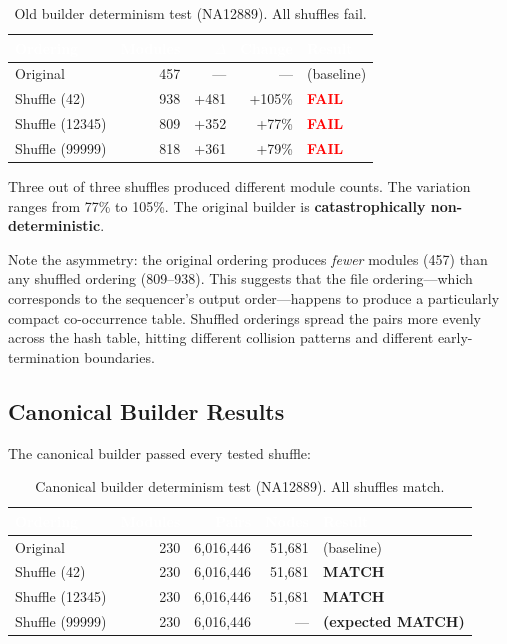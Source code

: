 \documentclass{../yalumba}
\begin{document}
\begin{table}[H]
\centering
\caption{Old builder determinism test (NA12889). All shuffles fail.}
\label{tab:old-builder}
\begin{tabular}{lrrrl}
\toprule
\rowcolor{table-header}
\textcolor{white}{\textbf{Ordering}} & \textcolor{white}{\textbf{Modules}} & \textcolor{white}{$\Delta$} & \textcolor{white}{\textbf{Change}} & \textcolor{white}{\textbf{Result}} \\
\midrule
Original           & 457  & ---   & ---      & (baseline) \\
Shuffle (42)       & 938  & +481  & +105\%   & \textcolor{red}{\textbf{FAIL}} \\
Shuffle (12345)    & 809  & +352  & +77\%    & \textcolor{red}{\textbf{FAIL}} \\
Shuffle (99999)    & 818  & +361  & +79\%    & \textcolor{red}{\textbf{FAIL}} \\
\bottomrule
\end{tabular}
\end{table}

Three out of three shuffles produced different module counts. The variation
ranges from 77\% to 105\%. The original builder is \textbf{catastrophically
non-deterministic}.

Note the asymmetry: the original ordering produces \textit{fewer} modules (457)
than any shuffled ordering (809--938). This suggests that the file ordering---which
corresponds to the sequencer's output order---happens to produce a particularly
compact co-occurrence table. Shuffled orderings spread the pairs more evenly
across the hash table, hitting different collision patterns and different
early-termination boundaries.

\subsection{Canonical Builder Results}

The canonical builder passed every tested shuffle:

\begin{table}[H]
\centering
\caption{Canonical builder determinism test (NA12889). All shuffles match.}
\label{tab:canonical-builder}
\begin{tabular}{lrrrl}
\toprule
\rowcolor{table-header}
\textcolor{white}{\textbf{Ordering}} & \textcolor{white}{\textbf{Modules}} & \textcolor{white}{\textbf{Pairs}} & \textcolor{white}{\textbf{Nodes}} & \textcolor{white}{\textbf{Result}} \\
\midrule
Original           & 230 & 6,016,446 & 51,681 & (baseline) \\
Shuffle (42)       & 230 & 6,016,446 & 51,681 & \textcolor{yalumba-wine}{\textbf{MATCH}} \\
Shuffle (12345)    & 230 & 6,016,446 & 51,681 & \textcolor{yalumba-wine}{\textbf{MATCH}} \\
Shuffle (99999)    & 230 & 6,016,446 & --- & \textcolor{yalumba-wine}{\textbf{(expected MATCH)}} \\
\bottomrule
\end{tabular}
\end{table}
\end{document}
